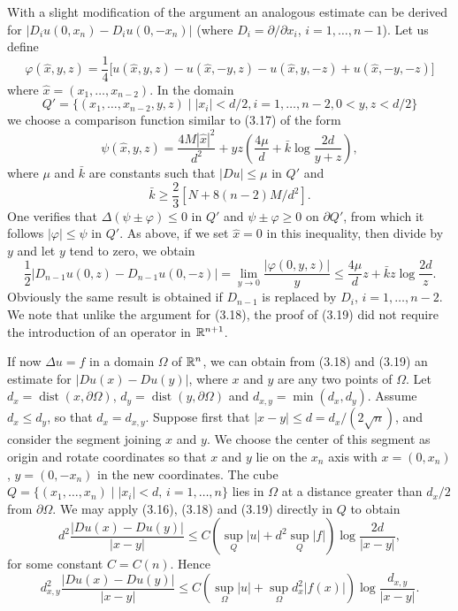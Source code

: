 With a slight modification of the argument an analogous estimate can be derived for $|D_i u(0,x_n)-D_i u(0,-x_n)|$ (where $D_i=\partial/\partial x_i$, $i=1,\ldots,n-1$). Let us define
\[
\varphi(\hat{x},y,z)=\frac{1}{4}\bigl[u(\hat{x},y,z)-u(\hat{x},-y,z)-u(\hat{x},y,-z)+u(\hat{x},-y,-z)\bigr]
\]
where $\hat{x}=(x_1,\ldots,x_{n-2})$. In the domain
\[
Q'=\{(x_1,\ldots,x_{n-2},y,z)\mid |x_i|<d/2,i=1,\ldots,n-2,0<y,z<d/2\}
\]
we choose a comparison function similar to (3.17) of the form
\[
\psi(\hat{x},y,z)=\frac{4M|\hat{x}|^2}{d^2}+yz\left(\frac{4\mu}{d}+\bar{k}\log\frac{2d}{y+z}\right),
\]
where $\mu$ and $\bar{k}$ are constants such that $|Du|\le \mu$ in $Q'$ and
\[
\bar{k}\ge \frac{2}{3}[N+8(n-2)M/d^2].
\]
One verifies that $\Delta(\psi\pm\varphi)\le 0$ in $Q'$ and $\psi\pm\varphi\ge 0$ on $\partial Q'$, from which it follows $|\varphi|\le \psi$ in $Q'$. As above, if we set $\hat{x}=0$ in this inequality, then divide by $y$ and let $y$ tend to zero, we obtain
\begin{equation}
\tag{3.19}
\frac{1}{2}|D_{n-1}u(0,z)-D_{n-1}u(0,-z)|=\lim_{y\to 0}\frac{|\varphi(0,y,z)|}{y}\le \frac{4\mu}{d}z+\bar{k}z\log\frac{2d}{z}.
\end{equation}
Obviously the same result is obtained if $D_{n-1}$ is replaced by $D_i$, $i=1,\ldots,n-2$.
We note that unlike the argument for (3.18), the proof of (3.19) did not require the introduction of an operator in $\mathbb{R}^{n+1}$.

If now $\Delta u=f$ in a domain $\Omega$ of $\mathbb{R}^n$, we can obtain from (3.18) and (3.19) an estimate for $|Du(x)-Du(y)|$, where $x$ and $y$ are any two points of $\Omega$. Let $d_x=\operatorname{dist}(x,\partial\Omega)$, $d_y=\operatorname{dist}(y,\partial\Omega)$ and $d_{x,y}=\min(d_x,d_y)$. Assume $d_x\le d_y$, so that $d_x=d_{x,y}$. Suppose first that $|x-y|\le d=d_x/(2\sqrt{n})$, and consider the segment joining $x$ and $y$. We choose the center of this segment as origin and rotate coordinates so that $x$ and $y$ lie on the $x_n$ axis with $x=(0,x_n)$, $y=(0,-x_n)$ in the new coordinates. The cube $Q=\{(x_1,\ldots,x_n)\mid |x_i|<d,\, i=1,\ldots,n\}$ lies in $\Omega$ at a distance greater than $d_x/2$ from $\partial\Omega$. We may apply (3.16), (3.18) and (3.19) directly in $Q$ to obtain
\[
d^2\frac{|Du(x)-Du(y)|}{|x-y|}\le C\left(\sup_Q |u|+d^2\sup_Q |f|\right)\log\frac{2d}{|x-y|},
\]
for some constant $C=C(n)$. Hence
\[
d_{x,y}^2\frac{|Du(x)-Du(y)|}{|x-y|}\le C\left(\sup_{\Omega}|u|+\sup_{\Omega}d_x^2|f(x)|\right)\log\frac{d_{x,y}}{|x-y|}.
\]


